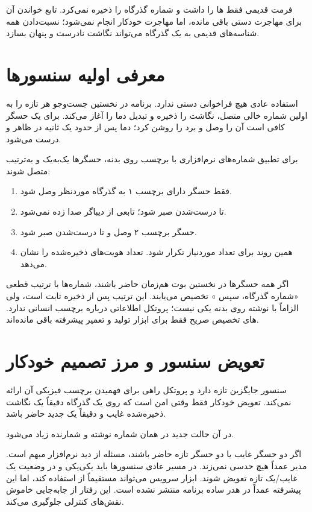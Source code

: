 فرمت قدیمی فقط ها را داشت و شماره گذرگاه را ذخیره نمی‌کرد. تابع خواندن آن برای مهاجرت دستی باقی مانده، اما مهاجرت خودکار انجام نمی‌شود؛ نسبت‌دادن همه شناسه‌های قدیمی به یک گذرگاه می‌تواند نگاشت نادرست و پنهان بسازد.

\section{معرفی اولیه سنسورها}
استفاده عادی هیچ فراخوانی دستی ندارد. برنامه در نخستین جست‌وجو هر  تازه را به اولین شماره خالی متصل، نگاشت را ذخیره و تبدیل دما را آغاز می‌کند. برای یک حسگر کافی است آن را وصل و برد را روشن کرد؛ دما پس از حدود یک ثانیه در  ظاهر و  درست می‌شود.

برای تطبیق شماره‌های نرم‌افزاری با برچسب روی بدنه، حسگرها یک‌به‌یک و به‌ترتیب متصل شوند:

\begin{enumerate}
  \item فقط حسگر دارای برچسب ۱ به گذرگاه موردنظر وصل شود.
  \item تا درست‌شدن  صبر شود؛ تابعی از دیباگر صدا زده نمی‌شود.
  \item حسگر برچسب ۲ وصل و تا درست‌شدن  صبر شود.
  \item همین روند برای تعداد موردنیاز تکرار شود.  تعداد هویت‌های ذخیره‌شده را نشان می‌دهد.
\end{enumerate}

اگر همه حسگرها در نخستین بوت هم‌زمان حاضر باشند، شماره‌ها با ترتیب قطعی «شماره گذرگاه، سپس » تخصیص می‌یابند. این ترتیب پس از ذخیره ثابت است، ولی الزاماً با نوشته روی بدنه یکی نیست؛ پروتکل اطلاعاتی درباره برچسب انسانی ندارد. های تخصیص صریح فقط برای ابزار تولید و تعمیر پیشرفته باقی مانده‌اند.

\section{تعویض سنسور و مرز تصمیم خودکار}
سنسور جایگزین  تازه دارد و پروتکل راهی برای فهمیدن برچسب فیزیکی آن ارائه نمی‌کند. تعویض خودکار فقط وقتی امن است که روی یک گذرگاه دقیقاً یک نگاشت ذخیره‌شده غایب و دقیقاً یک  جدید حاضر باشد.

در آن حالت  جدید در همان شماره نوشته و شمارنده
زیاد می‌شود.

اگر دو حسگر غایب یا دو حسگر تازه حاضر باشند، مسئله از دید نرم‌افزار مبهم است. مدیر عمداً هیچ حدسی نمی‌زند. در مسیر عادی سنسورها باید یکی‌یکی و در وضعیت یک غایب/یک تازه تعویض شوند. ابزار سرویس می‌تواند مستقیماً از  استفاده کند، اما این  پیشرفته عمداً در هدر ساده برنامه منتشر نشده است. این رفتار از جابه‌جایی خاموش نقش‌های کنترلی جلوگیری می‌کند.

